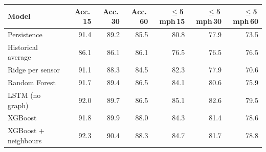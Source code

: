 \begin{tabular}{@{}lrrrrrr@{}}
\toprule
Model & Acc.\,15 & Acc.\,30 & Acc.\,60 & $\leq$5\,mph\,15 & $\leq$5\,mph\,30 & $\leq$5\,mph\,60 \\
\midrule
Persistence & 91.4 & 89.2 & 85.5 & 80.8 & 77.9 & 73.5 \\
Historical average & 86.1 & 86.1 & 86.1 & 76.5 & 76.5 & 76.5 \\
Ridge per sensor & 91.1 & 88.3 & 84.5 & 82.3 & 77.9 & 70.6 \\
Random Forest & 91.7 & 89.4 & 86.5 & 84.1 & 80.6 & 75.9 \\
LSTM (no graph) & 92.0 & 89.7 & 86.5 & 85.1 & 82.6 & 79.5 \\
XGBoost & 91.8 & 89.9 & 88.0 & 84.3 & 81.4 & 78.6 \\
XGBoost + neighbours & 92.3 & 90.4 & 88.3 & 84.7 & 81.7 & 78.8 \\
\bottomrule
\end{tabular}
